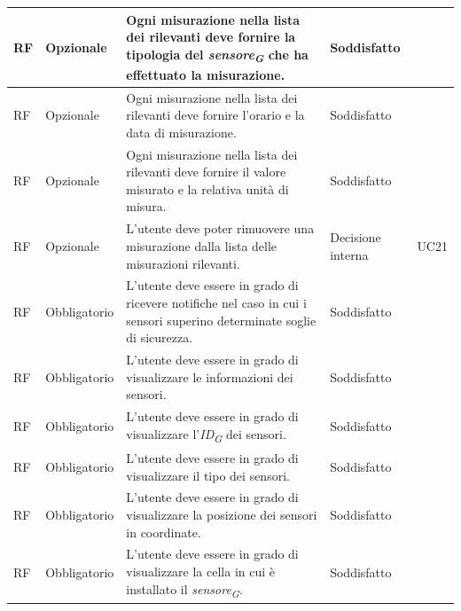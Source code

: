 \begin{longtable}{|C{1.5cm}|C{2cm}|L{5cm}|C{2cm}|C{1.5cm}|}
    \hline
     RF & Opzionale & Ogni misurazione nella lista dei rilevanti deve fornire la tipologia del \textit{sensore}\textsubscript{\textit{G}} che ha effettuato la misurazione.& Soddisfatto \\

    \hline
     RF & Opzionale & Ogni misurazione nella lista dei rilevanti deve fornire l'orario e la data di misurazione.& Soddisfatto \\

    \hline
     RF & Opzionale & Ogni misurazione nella lista dei rilevanti deve fornire il valore misurato e la relativa unità di misura.& Soddisfatto \\

    \hline
     RF & Opzionale & L'utente deve poter rimuovere una misurazione dalla lista delle misurazioni rilevanti.& Decisione interna & UC21 \\

    \hline
     RF & Obbligatorio & L'utente deve essere in grado di ricevere notifiche nel caso in cui i sensori superino determinate soglie di sicurezza.& Soddisfatto \\

    \hline
     RF & Obbligatorio & L'utente deve essere in grado di visualizzare le informazioni dei sensori.& Soddisfatto \\

    \hline
     RF & Obbligatorio & L'utente deve essere in grado di visualizzare l'\textit{ID}\textsubscript{\textit{G}} dei sensori.& Soddisfatto \\

    \hline
     RF & Obbligatorio & L'utente deve essere in grado di visualizzare il tipo dei sensori.& Soddisfatto \\

    \hline
     RF & Obbligatorio & L'utente deve essere in grado di visualizzare la posizione dei sensori in coordinate.& Soddisfatto \\

    \hline
     RF & Obbligatorio & L'utente deve essere in grado di visualizzare la cella in cui è installato il \textit{sensore}\textsubscript{\textit{G}}.& Soddisfatto \\


\end{longtable}
